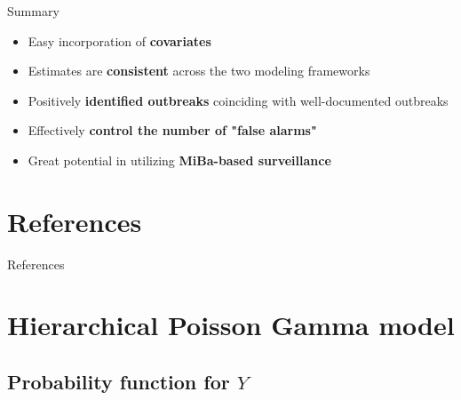 \documentclass[aspectratio=169]{beamer}
\begin{document}
\begin{frame}{Summary}
\begin{itemize}
  \item Easy incorporation of \textbf{covariates}
  \item Estimates are \textbf{consistent} across the two modeling frameworks
  \item Positively \textbf{identified outbreaks} coinciding with well-documented outbreaks
  \item Effectively \textbf{control the number of "false alarms"}
  \item Great potential in utilizing \textbf{MiBa-based surveillance}
\end{itemize}
\end{frame}

\hypertarget{references}{%
\section{References}\label{references}}

\begin{frame}{References}
\printbibliography[heading=none]
\end{frame}

\hypertarget{hierarchical-poisson-gamma-model}{%
\section{Hierarchical Poisson Gamma
model}\label{hierarchical-poisson-gamma-model}}

\hypertarget{probability-function-for-y}{%
\subsection{\texorpdfstring{Probability function for
\(Y\)}{Probability function for Y}}\label{probability-function-for-y}}
\end{document}
